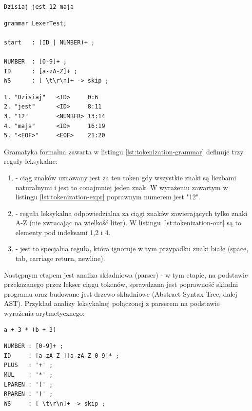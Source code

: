 \begin{lstlisting}[caption={Wyrażenie - tokenizacja}, label={lst:tokenization-expr}]
Dzisiaj jest 12 maja
\end{lstlisting}


\begin{lstlisting}[caption={Gramatyka formalna - tokenizacja}, label={lst:tokenization-grammar}]
grammar LexerTest;

start   : (ID | NUMBER)+ ;

NUMBER  : [0-9]+ ;
ID      : [a-zA-Z]+ ;
WS      : [ \t\r\n]+ -> skip ;
\end{lstlisting}

\begin{lstlisting}[caption={Wynik tokenizacji}, label={lst:tokenization-out}]
1. "Dzisiaj"   <ID>     0:6 
2. "jest"      <ID>     8:11 
3. "12"        <NUMBER> 13:14 
4. "maja"      <ID>     16:19
5. "<EOF>"     <EOF>    21:20
\end{lstlisting}
Gramatyka formalna zawarta w listingu \ref{lst:tokenization-grammar} definuje trzy reguły leksykalne: 

\begin{enumerate}
\item[NUMBER] - ciąg znaków uznawany jest za ten token gdy wszystkie znaki są liczbami naturalnymi i jest to conajmniej jeden znak. W wyrażeniu zawartym w listingu \ref{lst:tokenization-expr} poprawnym numerem jest "12".
\item[ID] - reguła leksykalna odpowiedzialna za ciągi znaków zawierających tylko znaki A-Z (nie zwracając na wielkość liter). W listingu \ref{lst:tokenization-out} są to elementy pod indeksami 1,2 i 4.
\item[WS] - jest to specjalna reguła, która ignoruje w tym przypadku znaki białe (space, tab, carriage return, newline). 
\end{enumerate}
Następnym etapem jest analiza składniowa (parser) - w tym etapie, na podstawie przekazanego przez lekser ciągu tokenów, sprawdzana jest poprawność składni programu oraz budowane jest drzewo składniowe (Abstract Syntax Tree, dalej AST)\cite{bib:ast-how-far-are-we}. Przykład analizy leksykalnej połączonej z parserem na podstawie wyrażenia arytmetycznego:

\begin{lstlisting}[caption={Przykładowe wyrażenie arytmetyczne}, label={lst:aritm-expr}]
a + 3 * (b + 3)
\end{lstlisting}

\begin{lstlisting}[caption={Reguły leksykalne}, label={lst:aritm-tokens}]
NUMBER : [0-9]+ ;
ID     : [a-zA-Z_][a-zA-Z_0-9]* ;
PLUS   : '+' ;
MUL    : '*' ;
LPAREN : '(' ;
RPAREN : ')' ;
WS     : [ \t\r\n]+ -> skip ;
\end{lstlisting}

